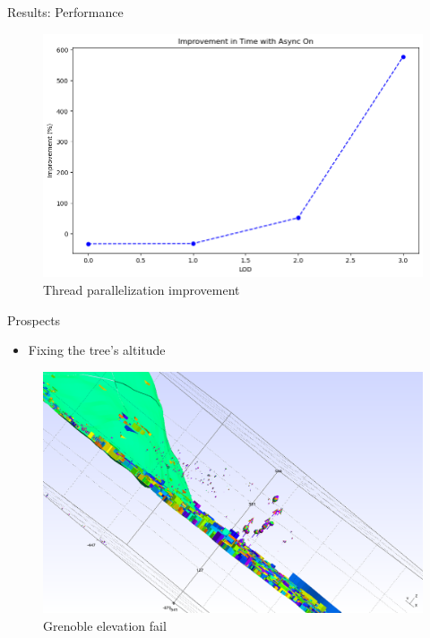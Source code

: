 \documentclass[10pt]{beamer}
\begin{document}
\begin{frame}{Results: Performance}
	\Large
	\begin{figure}[H]
		\centering
		\includegraphics[width=1\textwidth]{images/perf_async_improv.png}
		\caption{Thread parallelization improvement}
	\end{figure}
\end{frame}

\begin{frame}{Prospects}
	\begin{itemize}
		\item Fixing the tree's altitude
	\end{itemize}

	\begin{figure}
		\centering
		\includegraphics[width=\textwidth]{images/grenoble_fail.png}
		\caption{Grenoble elevation fail}
		\label{fig:figure1}
	\end{figure}
\end{frame}
\end{document}
